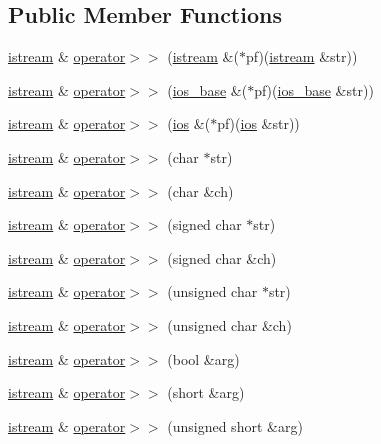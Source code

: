 \subsection*{Public Member Functions}
\begin{DoxyCompactItemize}
\item 
\hyperlink{classistream}{istream} \& \hyperlink{classistream_aa67d3b8ac67e2097d876a66657ec6067}{operator$>$$>$} (\hyperlink{classistream}{istream} \&($\ast$pf)(\hyperlink{classistream}{istream} \&str))
\item 
\hyperlink{classistream}{istream} \& \hyperlink{classistream_ac6e2f17c80edd19deecdc20f804c424e}{operator$>$$>$} (\hyperlink{classios__base}{ios\+\_\+base} \&($\ast$pf)(\hyperlink{classios__base}{ios\+\_\+base} \&str))
\item 
\hyperlink{classistream}{istream} \& \hyperlink{classistream_a5a0a2c0e06abadb79951ebe34f36d62a}{operator$>$$>$} (\hyperlink{classios}{ios} \&($\ast$pf)(\hyperlink{classios}{ios} \&str))
\item 
\hyperlink{classistream}{istream} \& \hyperlink{classistream_a99db66d2e192f02deff0171ad098271f}{operator$>$$>$} (char $\ast$str)
\item 
\hyperlink{classistream}{istream} \& \hyperlink{classistream_addaf5e0f39a15cc213117165dfef0d77}{operator$>$$>$} (char \&ch)
\item 
\hyperlink{classistream}{istream} \& \hyperlink{classistream_a390af4d28adbdc537e436f2121d1c862}{operator$>$$>$} (signed char $\ast$str)
\item 
\hyperlink{classistream}{istream} \& \hyperlink{classistream_a49ab1a573fbf69809d19a52855a30072}{operator$>$$>$} (signed char \&ch)
\item 
\hyperlink{classistream}{istream} \& \hyperlink{classistream_a52e85d01198968330f20026a52cb9f72}{operator$>$$>$} (unsigned char $\ast$str)
\item 
\hyperlink{classistream}{istream} \& \hyperlink{classistream_a74875fcf9ccdc0dca4b46a0b66821798}{operator$>$$>$} (unsigned char \&ch)
\item 
\hyperlink{classistream}{istream} \& \hyperlink{classistream_a3708636d095d360695e9c23335639317}{operator$>$$>$} (bool \&arg)
\item 
\hyperlink{classistream}{istream} \& \hyperlink{classistream_a662060e885a0551c390b7042b3b9e4a5}{operator$>$$>$} (short \&arg)
\item 
\hyperlink{classistream}{istream} \& \hyperlink{classistream_a31a706a374c5a594e400734b8992e2a0}{operator$>$$>$} (unsigned short \&arg)

\end{DoxyCompactItemize}
